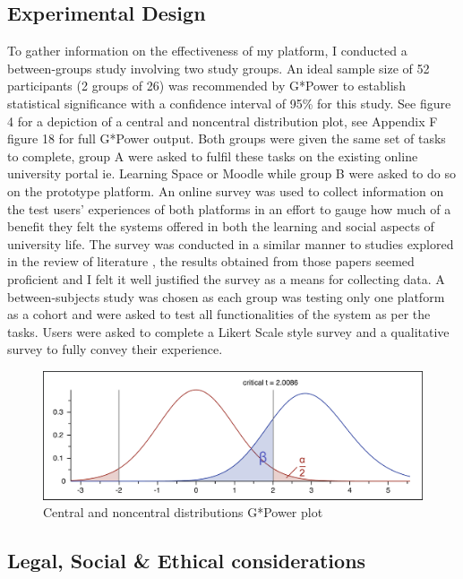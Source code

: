 \documentclass[lettersize,journal]{IEEEtran}
\begin{document}
        \subsection{Experimental Design}
        To gather information on the effectiveness of my platform, I conducted a between-groups study involving
	two study groups. An ideal sample size of 52 participants (2 groups of 26) was recommended by G*Power to establish statistical significance with a confidence interval of 95\%
	for this study. See figure 4 for a depiction of a central and noncentral distribution plot, see Appendix F figure 18 for full G*Power output.
	Both groups were given the same set of tasks to complete, group A were asked to fulfil
        these tasks on the existing online university portal ie. Learning Space or Moodle while group B were asked to 
        do so on the prototype platform. An online survey was used to collect information on the test users' experiences
        of both platforms in an effort to gauge how much of a benefit they felt the systems offered in both the
        learning and social aspects of university life. The survey was conducted in a similar manner to
        studies explored in the review of literature \cite{Liu2010}\cite{Baruah2012}\cite{Wang2011}\cite{Evans2014}\cite{Akram et al 2017},
        the results obtained from those papers seemed proficient and I felt it well justified the survey as a means for collecting data.
        A between-subjects study was chosen as each group was testing only one platform as a cohort and were asked to test all functionalities of
        the system as per the tasks. Users were asked to complete a Likert Scale style survey and a qualitative survey to fully convey their experience.
	        \begin{figure}[h!]
                \includegraphics[width=\linewidth]{images/gpowerplot.png}
                \caption{Central and noncentral distributions G*Power plot}
                \label{figure 3}
        \end{figure}
	\subsection{Legal, Social \& Ethical considerations}
\end{document}
